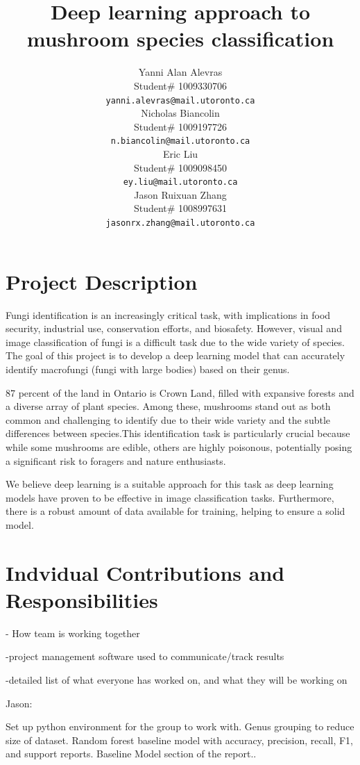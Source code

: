 \documentclass{article} %
\title{Deep learning approach to  \\ 
mushroom species classification}
\author{Yanni Alan Alevras  \\
Student\# 1009330706 \\
\texttt{yanni.alevras@mail.utoronto.ca} \\
\And
Nicholas Biancolin  \\
Student\# 1009197726 \\
\texttt{n.biancolin@mail.utoronto.ca} \\
\AND
Eric Liu  \\
Student\# 1009098450 \\
\texttt{ey.liu@mail.utoronto.ca} \\
\And
Jason Ruixuan Zhang \\
Student\# 1008997631 \\
\texttt{jasonrx.zhang@mail.utoronto.ca} \\
\AND
}
\begin{document}
\maketitle

\section{Project Description}
\label{sec:project_description}

Fungi identification is an increasingly critical task, with implications in food security, industrial use, conservation efforts, and biosafety. However, visual and image classification of fungi is a difficult task due to the wide variety of species. The goal of this project is to develop a deep learning model that can accurately identify macrofungi (fungi with large bodies) based on their genus. 

87 percent of the land in Ontario is Crown Land, filled with expansive forests and a diverse array of plant species. Among these, mushrooms stand out as both common and challenging to identify due to their wide variety and the subtle differences between species.This identification task is particularly crucial because while some mushrooms are edible, others are highly poisonous, potentially posing a significant risk to foragers and nature enthusiasts.

We believe deep learning is a suitable approach for this task as deep learning models have proven to be effective in image classification tasks. Furthermore, there is a robust amount of data available for training, helping to ensure a solid model.


\section{Indvidual Contributions and Responsibilities}
\label{sec:individual_contributions_and_responsibilities}

- How team is working together


-project management software used to communicate/track results


-detailed list of what everyone has worked on, and what they will be working on

Jason:

Set up python environment for the group to work with. Genus grouping to reduce size of dataset. Random forest baseline model with accuracy, precision, recall, F1, and support reports. Baseline Model section of the report..
\end{document}
